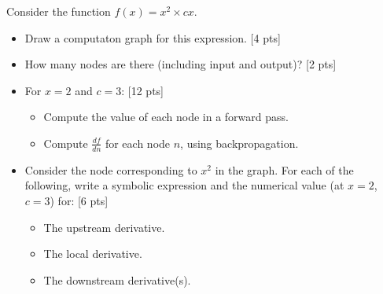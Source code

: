 \documentclass[11pt]{article}
\begin{document}
  Consider the function $f(x) = x^2 \times cx$.
\begin{itemize}
  \item Draw a computaton graph for this expression. [4 pts]
  \item How many nodes are there (including input and output)? [2 pts]
  \item For $x = 2$ and $c=3$: [12 pts]
    \begin{itemize}
      \item Compute the value of each node in a forward pass.
      \item Compute $\frac{df}{dn}$ for each node $n$, using backpropagation.
    \end{itemize}
  \item Consider the node corresponding to $x^2$ in the graph.  For each of the following, write a symbolic expression and the numerical value (at $x=2$, $c=3$) for: [6 pts]
    \begin{itemize}
      \item The upstream derivative.
      \item The local derivative.
      \item The downstream derivative(s).
    \end{itemize}
\end{itemize}

\end{document}
